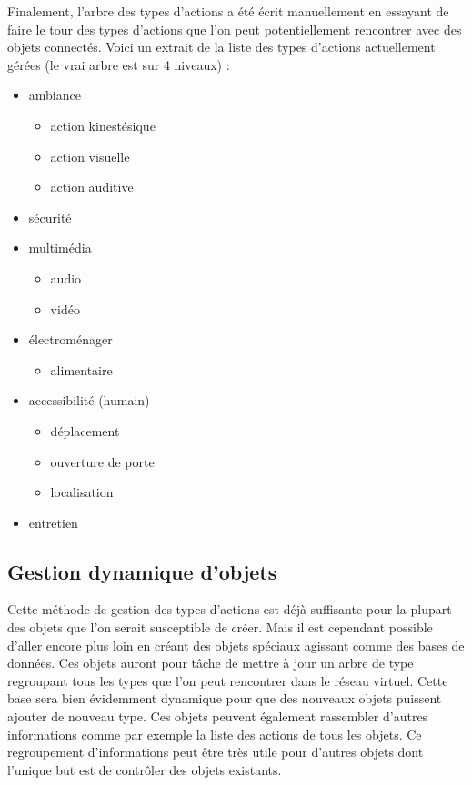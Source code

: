 		Finalement, l'arbre des types d'actions a été écrit manuellement en essayant de faire le tour
		des types d'actions que l'on peut potentiellement rencontrer avec des objets connectés. Voici
		un extrait de la liste des types d'actions actuellement gérées (le vrai arbre est sur 4 
		niveaux) :
		\begin{itemize}
			\item ambiance
			\begin{itemize}
				\item action kinestésique
				\item action visuelle
				\item action auditive
			\end{itemize}
			\item sécurité
			\item multimédia
			\begin{itemize}
				\item audio
				\item vidéo
			\end{itemize}
			\item électroménager
			\begin{itemize}
				\item alimentaire
			\end{itemize}
			\item accessibilité (humain)
			\begin{itemize}
				\item déplacement
				\item ouverture de porte
				\item localisation
			\end{itemize}
			\item entretien
		\end{itemize}

	\subsection{Gestion dynamique d’objets}
		Cette méthode de gestion des types d'actions est déjà suffisante pour la plupart des objets
		que l'on serait susceptible de créer. Mais il est cependant possible d'aller encore plus loin
		en créant des objets spéciaux agissant comme des bases de données. Ces objets auront pour
		tâche de mettre à jour un arbre de type regroupant tous les types que l'on peut rencontrer
		dans le réseau virtuel. Cette base sera bien évidemment dynamique pour que des nouveaux objets
		puissent ajouter de nouveau type. Ces objets peuvent également rassembler d'autres
		informations comme par exemple la liste des actions de tous les objets. Ce regroupement
		d'informations peut être très utile pour d'autres objets dont l'unique but est de contrôler
		des objets existants.
		
